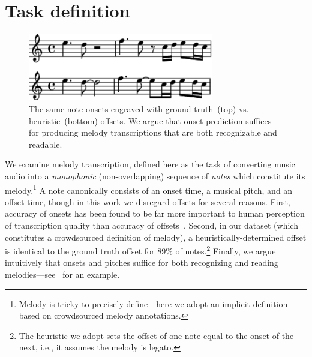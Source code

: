\section{Task definition}

\begin{figure}
    \centering
    \includegraphics[width=8.1cm]{figs/heuristic_offsets.pdf}
    \caption{
The same note onsets engraved with ground truth~(top) vs. heuristic~(bottom) offsets. 
We argue that onset prediction suffices for producing melody transcriptions that are both recognizable and readable. 
}
 \label{fig:heuristic_offsets}
\end{figure}


We examine melody transcription, defined here as the task of converting music audio into a \emph{monophonic} (non-overlapping) sequence of \emph{notes} which constitute its melody.\footnote{Melody is tricky to precisely define---here we adopt an implicit definition based on crowdsourced melody annotations.} 
A note canonically consists of an onset time, a musical pitch, and an offset time, though in this work  
we disregard offsets for several reasons. 
First, accuracy of onsets has been found to be far more important to human perception of transcription quality than accuracy of offsets~\cite{ycart2020investigating}. 
Second, in our dataset (which constitutes a crowdsourced definition of melody), a heuristically-determined offset is identical to the ground truth offset for $89\%$ of notes.\footnote{The heuristic we adopt sets the offset of one note equal to the onset of the next, i.e., it assumes the melody is legato.}
Finally, we argue intuitively that onsets and pitches suffice for both recognizing and reading melodies---see~ for an example. 

